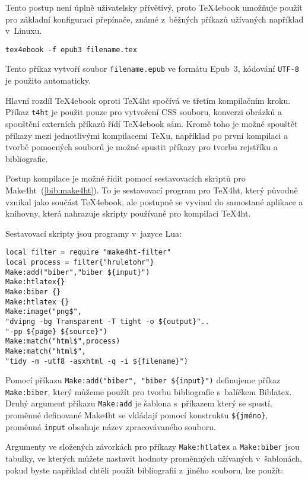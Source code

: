 \documentclass{csbulletin}
\renewcommand\cite[1]{(\ref{#1})}
\begin{document}
Tento postup není úplně uživatelsky přívětivý, proto \TeX{}4ebook umožňuje
použít pro základní konfiguraci přepínače, známé z~běžných příkazů užívaných
například v~Linuxu.

\begin{verbatim}
tex4ebook -f epub3 filename.tex
\end{verbatim}

Tento příkaz vytvoří soubor \texttt{filename.epub} ve formátu Epub~3, kódování
\texttt{UTF-8} je použito automaticky. 

Hlavní rozdíl \TeX{}4ebook oproti \TeX{}4ht spočívá ve třetím kompilačním kroku.
Příkaz \texttt{t4ht} je použit pouze pro vytvoření CSS souboru, konverzi
obrázků a spouštění externích příkazů řídí \TeX{}4ebook sám. Kromě toho je možné
spouštět příkazy mezi jednotlivými kompilacemi \TeX u, například po první
kompilaci a tvorbě pomocných souborů je možné spustit příkazy pro tvorbu
rejstříku a bibliografie. 

Postup kompilace je možné řídit pomocí sestavovacích skriptů pro
Make4ht~\cite{bib:make4ht}. To je sestavovací program
pro \TeX{}4ht, který původně vznikal jako součást \TeX{}4ebook, ale postupně se
vyvinul do samostané aplikace a knihovny, která nahrazuje skripty používané pro
kompilaci \TeX{}4ht.

Sestavovací skripty jsou programy v~jazyce Lua:

\begin{verbatim}
local filter = require "make4ht-filter"
local process = filter{"hruletohr"}
Make:add("biber","biber ${input}")
Make:htlatex{}
Make:biber {}
Make:htlatex {}
Make:image("png$",                                                          
"dvipng -bg Transparent -T tight -o ${output}"..
"-pp ${page} ${source}")
Make:match("html$",process)
Make:match("html$",
"tidy -m -utf8 -asxhtml -q -i ${filename}")
\end{verbatim}


Pomocí příkazu \verb|Make:add("biber", "biber ${input}")| definujeme příkaz
\verb|Make:biber|, který můžeme použít  pro tvorbu bibliografie s~balíčkem
Biblatex. Druhý argument příkazu \verb|Make:add| je šablona s~příkazem který se
spustí, proměnné definované Make4ht se vkládají pomocí konstruktu
\verb|${jméno}|, proměnná \texttt{input} obsahuje název zpracovávaného souboru.

Argumenty ve složených závorkách pro příkazy \texttt{Make:htlatex} a
\texttt{Make:biber} jsou tabulky, ve kterých můžete nastavit hodnoty
proměnných užívaných v~šablonách, pokud byste například chtěli použít
bibliografii z~jiného souboru, lze použít:
\end{document}
